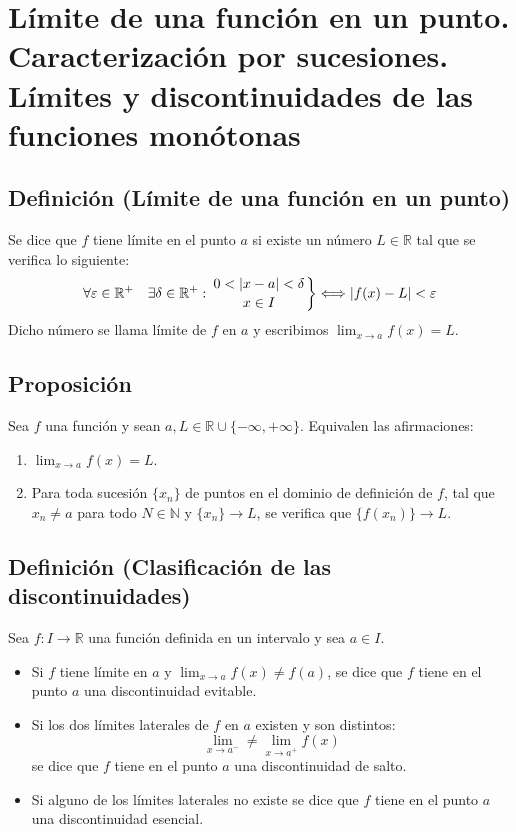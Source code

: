 \documentclass[10pt,a4paper]{article}
\begin{document}
	\newpage
	
	\section{Límite de una función en un punto. Caracterización por sucesiones. Límites y discontinuidades de las funciones monótonas}
	
	\subsection{Definición (Límite de una función en un punto)}
	
	Se dice que $f$ tiene límite en el punto $a$ si existe un número $L \in \mathbb{R}$ tal que se verifica lo siguiente:
	$$ \forall \varepsilon \in \mathbb{R}^+ \quad \exists \delta \in \mathbb{R}^+ : \left. 0 < |x-a| < \delta \atop x \in I \right\} \Longleftrightarrow |f(x) - L| < \varepsilon$$
	Dicho número se llama límite de $f$ en $a$ y escribimos $\displaystyle \lim_{x \rightarrow a} f(x) = L$.
	
	\subsection{Proposición}
	Sea $f$ una función y sean $a, L \in \mathbb{R} \cup \{-\infty, + \infty\}$. Equivalen las afirmaciones:
	\begin{enumerate}[label = \roman*)]
		\item $\displaystyle \lim_{x \rightarrow a} f(x) = L$.
		\item Para toda sucesión $\{x_n\}$ de puntos en el dominio de definición de $f$, tal que $x_n \neq a$ para todo $N \in \mathbb{N}$ y $\{x_n\} \rightarrow L$, se verifica que $\{f(x_n)\} \rightarrow L$.
	\end{enumerate}
	
	\subsection{Definición (Clasificación de las discontinuidades)}
	Sea $f: I \rightarrow \mathbb{R}$ una función definida en un intervalo y sea $a \in I$.
	
	\begin{itemize}
		\item Si $f$ tiene límite en $a$ y $\displaystyle \lim_{x \rightarrow a} f(x) \neq f(a)$, se dice que $f$ tiene en el punto $a$ una discontinuidad evitable.
		\item Si los dos límites laterales de $f$ en $a$ existen y son distintos:
		$$ \lim_{x \rightarrow a^-} \neq \lim_{x \rightarrow a^+} f(x)$$
		se dice que $f$ tiene en el punto $a$ una discontinuidad de salto.
		\item Si alguno de los límites laterales no existe se dice que $f$ tiene en el punto $a$ una discontinuidad esencial.
	\end{itemize}
\end{document}
